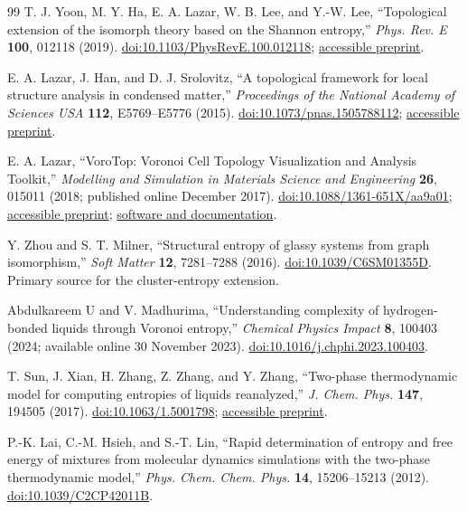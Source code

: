 \documentclass[11pt,a4paper]{article}
\begin{document}
\begin{thebibliography}{99}
T. J. Yoon, M. Y. Ha, E. A. Lazar, W. B. Lee, and Y.-W. Lee,
``Topological extension of the isomorph theory based on the Shannon entropy,''
\textit{Phys. Rev. E} \textbf{100}, 012118 (2019).
\href{https://doi.org/10.1103/PhysRevE.100.012118}{doi:10.1103/PhysRevE.100.012118};
\href{https://arxiv.org/abs/1901.02772}{accessible preprint}.

E. A. Lazar, J. Han, and D. J. Srolovitz, ``A topological framework for local
structure analysis in condensed matter,'' \textit{Proceedings of the National
Academy of Sciences USA} \textbf{112}, E5769--E5776 (2015).
\href{https://doi.org/10.1073/pnas.1505788112}{doi:10.1073/pnas.1505788112};
\href{https://arxiv.org/abs/1508.05937}{accessible preprint}.

E. A. Lazar, ``VoroTop: Voronoi Cell Topology Visualization and Analysis
Toolkit,'' \textit{Modelling and Simulation in Materials Science and
Engineering} \textbf{26}, 015011 (2018; published online December 2017).
\href{https://doi.org/10.1088/1361-651X/aa9a01}{doi:10.1088/1361-651X/aa9a01};
\href{https://arxiv.org/abs/1804.04221}{accessible preprint};
\href{https://www.vorotop.org/}{software and documentation}.

Y. Zhou and S. T. Milner, ``Structural entropy of glassy systems from graph
isomorphism,'' \textit{Soft Matter} \textbf{12}, 7281--7288 (2016).
\href{https://doi.org/10.1039/C6SM01355D}{doi:10.1039/C6SM01355D}.
Primary source for the cluster-entropy extension.

Abdulkareem U and V. Madhurima, ``Understanding complexity of hydrogen-bonded
liquids through Voronoi entropy,'' \textit{Chemical Physics Impact}
\textbf{8}, 100403 (2024; available online 30 November 2023).
\href{https://doi.org/10.1016/j.chphi.2023.100403}{doi:10.1016/j.chphi.2023.100403}.

T. Sun, J. Xian, H. Zhang, Z. Zhang, and Y. Zhang,
``Two-phase thermodynamic model for computing entropies of liquids reanalyzed,''
\textit{J. Chem. Phys.} \textbf{147}, 194505 (2017).
\href{https://doi.org/10.1063/1.5001798}{doi:10.1063/1.5001798};
\href{https://arxiv.org/abs/1711.02041}{accessible preprint}.

P.-K. Lai, C.-M. Hsieh, and S.-T. Lin,
``Rapid determination of entropy and free energy of mixtures from molecular
dynamics simulations with the two-phase thermodynamic model,''
\textit{Phys. Chem. Chem. Phys.} \textbf{14}, 15206--15213 (2012).
\href{https://doi.org/10.1039/C2CP42011B}{doi:10.1039/C2CP42011B}.
\end{thebibliography}
\end{document}
